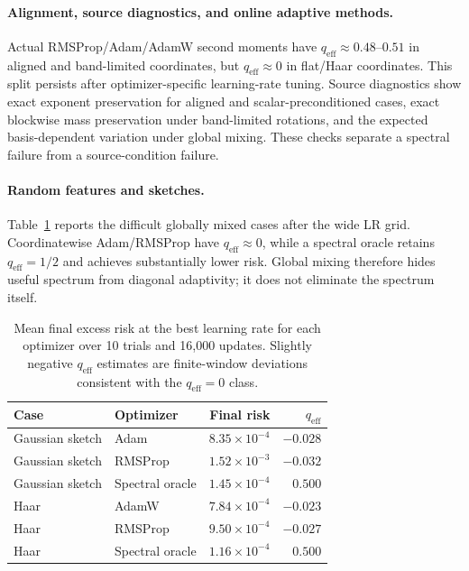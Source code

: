 \documentclass[letterpaper]{article} %
\newcommand{\qeff}{q_{\mathrm{eff}}}
\begin{document}
\paragraph{Alignment, source diagnostics, and online adaptive methods.}
Actual RMSProp/Adam/AdamW second moments have
$\qeff\approx0.48$--$0.51$ in aligned and band-limited coordinates, but $\qeff\approx0$ in flat/Haar coordinates.  This split persists after optimizer-specific learning-rate tuning.  Source diagnostics show exact exponent preservation for aligned and scalar-preconditioned cases, exact blockwise mass preservation under band-limited rotations, and the expected basis-dependent variation under global mixing.  These checks separate a spectral failure from a source-condition failure.

\paragraph{Random features and sketches.}
Table~\ref{tab:random-feature} reports the difficult globally mixed cases after the wide LR grid.  Coordinatewise Adam/RMSProp have $\qeff\approx0$, while a spectral oracle retains $\qeff=1/2$ and achieves substantially lower risk.  Global mixing therefore hides useful spectrum from diagonal adaptivity; it does not eliminate the spectrum itself.

\begin{table}[t]
\centering
\small
\caption{Mean final excess risk at the best learning rate for each optimizer over 10 trials and 16,000 updates. Slightly negative $\qeff$ estimates are finite-window deviations consistent with the $\qeff=0$ class.}
\label{tab:random-feature}
\setlength{\tabcolsep}{3pt}
\begin{tabular}{@{}llrr@{}}
\toprule
Case & Optimizer & Final risk & $\qeff$\\
\midrule
Gaussian sketch & Adam & $8.35\!\times\!10^{-4}$ & $-0.028$\\
Gaussian sketch & RMSProp & $1.52\!\times\!10^{-3}$ & $-0.032$\\
Gaussian sketch & Spectral oracle & $1.45\!\times\!10^{-4}$ & $0.500$\\
Haar & AdamW & $7.84\!\times\!10^{-4}$ & $-0.023$\\
Haar & RMSProp & $9.50\!\times\!10^{-4}$ & $-0.027$\\
Haar & Spectral oracle & $1.16\!\times\!10^{-4}$ & $0.500$\\
\bottomrule
\end{tabular}
\end{table}
\end{document}
